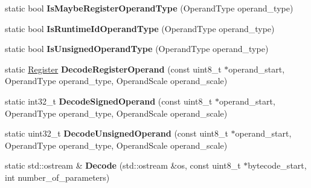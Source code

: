 \begin{DoxyCompactItemize}
\item 
static bool {\bfseries Is\+Maybe\+Register\+Operand\+Type} (Operand\+Type operand\+\_\+type)\hypertarget{classv8_1_1internal_1_1interpreter_1_1_bytecodes_a0a26a344b5b005e4cd4d0e39b508ff6b}{}\label{classv8_1_1internal_1_1interpreter_1_1_bytecodes_a0a26a344b5b005e4cd4d0e39b508ff6b}

\item 
static bool {\bfseries Is\+Runtime\+Id\+Operand\+Type} (Operand\+Type operand\+\_\+type)\hypertarget{classv8_1_1internal_1_1interpreter_1_1_bytecodes_ad26c48912c5c3cd9564a524995120c72}{}\label{classv8_1_1internal_1_1interpreter_1_1_bytecodes_ad26c48912c5c3cd9564a524995120c72}

\item 
static bool {\bfseries Is\+Unsigned\+Operand\+Type} (Operand\+Type operand\+\_\+type)\hypertarget{classv8_1_1internal_1_1interpreter_1_1_bytecodes_ad2a4f8ecd3f16eec011b54b97551c801}{}\label{classv8_1_1internal_1_1interpreter_1_1_bytecodes_ad2a4f8ecd3f16eec011b54b97551c801}

\item 
static \hyperlink{classv8_1_1internal_1_1interpreter_1_1_register}{Register} {\bfseries Decode\+Register\+Operand} (const uint8\+\_\+t $\ast$operand\+\_\+start, Operand\+Type operand\+\_\+type, Operand\+Scale operand\+\_\+scale)\hypertarget{classv8_1_1internal_1_1interpreter_1_1_bytecodes_a8b1cce9ae7e085ff948177605209154c}{}\label{classv8_1_1internal_1_1interpreter_1_1_bytecodes_a8b1cce9ae7e085ff948177605209154c}

\item 
static int32\+\_\+t {\bfseries Decode\+Signed\+Operand} (const uint8\+\_\+t $\ast$operand\+\_\+start, Operand\+Type operand\+\_\+type, Operand\+Scale operand\+\_\+scale)\hypertarget{classv8_1_1internal_1_1interpreter_1_1_bytecodes_a33349938622b2632dd92b7018f35478f}{}\label{classv8_1_1internal_1_1interpreter_1_1_bytecodes_a33349938622b2632dd92b7018f35478f}

\item 
static uint32\+\_\+t {\bfseries Decode\+Unsigned\+Operand} (const uint8\+\_\+t $\ast$operand\+\_\+start, Operand\+Type operand\+\_\+type, Operand\+Scale operand\+\_\+scale)\hypertarget{classv8_1_1internal_1_1interpreter_1_1_bytecodes_a06e50c2dd36840f9fb25091d39f7d6e0}{}\label{classv8_1_1internal_1_1interpreter_1_1_bytecodes_a06e50c2dd36840f9fb25091d39f7d6e0}

\item 
static std\+::ostream \& {\bfseries Decode} (std\+::ostream \&os, const uint8\+\_\+t $\ast$bytecode\+\_\+start, int number\+\_\+of\+\_\+parameters)\hypertarget{classv8_1_1internal_1_1interpreter_1_1_bytecodes_ae36502a013ba1f4cac7282e7d61bcae0}{}\label{classv8_1_1internal_1_1interpreter_1_1_bytecodes_ae36502a013ba1f4cac7282e7d61bcae0}


\end{DoxyCompactItemize}
